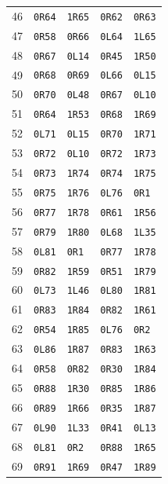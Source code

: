 {\begin{longtable}{rllll}
46 & \texttt{0R64} & \texttt{1R65} & \texttt{0R62} & \texttt{0R63}\\
47 & \texttt{0R58} & \texttt{0R66} & \texttt{0L64} & \texttt{1L65}\\
48 & \texttt{0R67} & \texttt{0L14} & \texttt{0R45} & \texttt{1R50}\\
49 & \texttt{0R68} & \texttt{0R69} & \texttt{0L66} & \texttt{0L15}\\
50 & \texttt{0R70} & \texttt{0L48} & \texttt{0R67} & \texttt{0L10}\\
51 & \texttt{0R64} & \texttt{1R53} & \texttt{0R68} & \texttt{1R69}\\
52 & \texttt{0L71} & \texttt{0L15} & \texttt{0R70} & \texttt{1R71}\\
53 & \texttt{0R72} & \texttt{0L10} & \texttt{0R72} & \texttt{1R73}\\
54 & \texttt{0R73} & \texttt{1R74} & \texttt{0R74} & \texttt{1R75}\\
55 & \texttt{0R75} & \texttt{1R76} & \texttt{0L76} & \texttt{0R1}\\
56 & \texttt{0R77} & \texttt{1R78} & \texttt{0R61} & \texttt{1R56}\\
57 & \texttt{0R79} & \texttt{1R80} & \texttt{0L68} & \texttt{1L35}\\
58 & \texttt{0L81} & \texttt{0R1} & \texttt{0R77} & \texttt{1R78}\\
59 & \texttt{0R82} & \texttt{1R59} & \texttt{0R51} & \texttt{1R79}\\
60 & \texttt{0L73} & \texttt{1L46} & \texttt{0L80} & \texttt{1R81}\\
61 & \texttt{0R83} & \texttt{1R84} & \texttt{0R82} & \texttt{1R61}\\
62 & \texttt{0R54} & \texttt{1R85} & \texttt{0L76} & \texttt{0R2}\\
63 & \texttt{0L86} & \texttt{1R87} & \texttt{0R83} & \texttt{1R63}\\
64 & \texttt{0R58} & \texttt{0R82} & \texttt{0R30} & \texttt{1R84}\\
65 & \texttt{0R88} & \texttt{1R30} & \texttt{0R85} & \texttt{1R86}\\
66 & \texttt{0R89} & \texttt{1R66} & \texttt{0R35} & \texttt{1R87}\\
67 & \texttt{0L90} & \texttt{1L33} & \texttt{0R41} & \texttt{0L13}\\
68 & \texttt{0L81} & \texttt{0R2} & \texttt{0R88} & \texttt{1R65}\\
69 & \texttt{0R91} & \texttt{1R69} & \texttt{0R47} & \texttt{1R89}\\

\end{longtable}}
